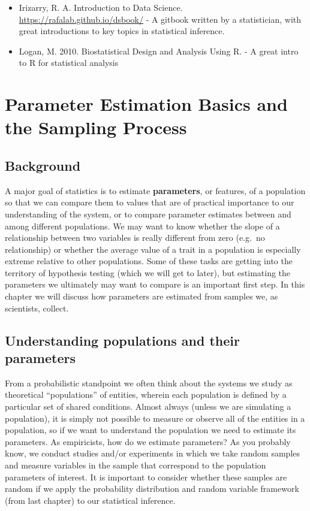 \documentclass[]{book}
\begin{document}
\begin{itemize}
\item
  Irizarry, R. A. Introduction to Data Science. \url{https://rafalab.github.io/dsbook/} - A gitbook written by a statistician, with great introductions to key topics in statistical inference.
\item
  Logan, M. 2010. Biostatistical Design and Analysis Using R. - A great intro to R for statistical analysis
\end{itemize}

\hypertarget{parameter-estimation-basics-and-the-sampling-process}{%
\chapter{Parameter Estimation Basics and the Sampling Process}\label{parameter-estimation-basics-and-the-sampling-process}}

\hypertarget{background-3}{%
\section{Background}\label{background-3}}

A major goal of statistics is to estimate \textbf{parameters}, or features, of a population so that we can compare them to values that are of practical importance to our understanding of the system, or to compare parameter estimates between and among different populations. We may want to know whether the slope of a relationship between two variables is really different from zero (e.g.~no relationship) or whether the average value of a trait in a population is especially extreme relative to other populations. Some of these tasks are getting into the territory of hypothesis testing (which we will get to later), but estimating the parameters we ultimately may want to compare is an important first step. In this chapter we will discuss how parameters are estimated from samples we, as scientists, collect.

\hypertarget{understanding-populations-and-their-parameters}{%
\section{Understanding populations and their parameters}\label{understanding-populations-and-their-parameters}}

From a probabilistic standpoint we often think about the systems we study as theoretical ``populations'' of entities, wherein each population is defined by a particular set of shared conditions. Almost always (unless we are simulating a population), it is simply not possible to measure or observe all of the entities in a population, so if we want to understand the population we need to estimate its parameters. As empiricists, how do we estimate parameters? As you probably know, we conduct studies and/or experiments in which we take random samples and measure variables in the sample that correspond to the population parameters of interest. It is important to consider whether these samples are random if we apply the probability distribution and random variable framework (from last chapter) to our statistical inference.
\end{document}
